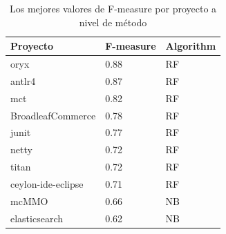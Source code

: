 \begin{table}[H]
\centering
\captionsetup{labelsep=period, labelfont=bf}
\caption{Los mejores valores de F-measure por proyecto a nivel de método}
\fontsize{12pt}{10pt}\selectfont
\begin{tabular}{lll}
\toprule 
\textbf{Proyecto} & \textbf{F-measure} & \textbf{Algorithm} \\ \midrule 
oryx & 0.88 & RF \\ 
antlr4 & 0.87 & RF \\ 
mct & 0.82 & RF \\ 
BroadleafCommerce & 0.78 & RF \\ 
junit & 0.77 & RF \\ 
netty & 0.72 & RF \\ 
titan & 0.72 & RF \\ 
ceylon-ide-eclipse & 0.71 & RF \\ 
mcMMO & 0.66 & NB \\ 
elasticsearch & 0.62 & NB \\ 
\bottomrule
\end{tabular}

\label{tab:best_f_measure}
\end{table}
